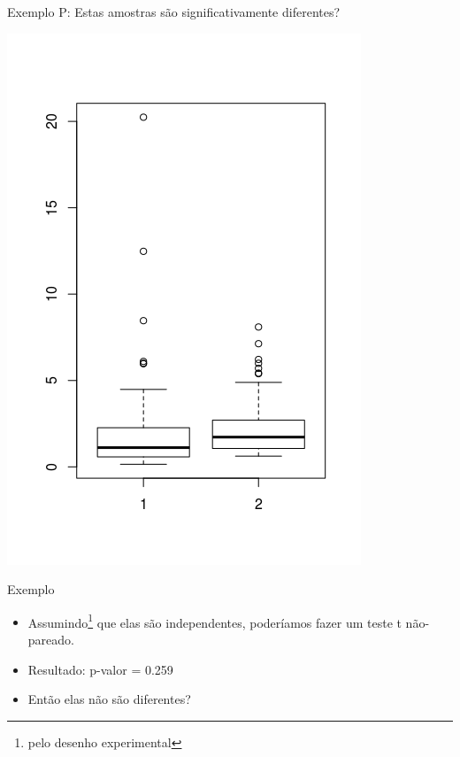 \documentclass{beamer}
\begin{document}
\begin{frame}{Exemplo}
P: Estas amostras são significativamente diferentes?

  \centering
  \includegraphics[height=\textheight]{Nao_Param/2samples-bp}
\end{frame}

\begin{frame}{Exemplo}
  \begin{itemize}
  \item Assumindo\footnote{pelo desenho experimental} que elas são independentes, poderíamos fazer um teste t não-pareado.
  \item Resultado: p-valor = \alert{0.259}
  \item Então elas não são diferentes?
  \end{itemize}
\end{frame}
\end{document}
